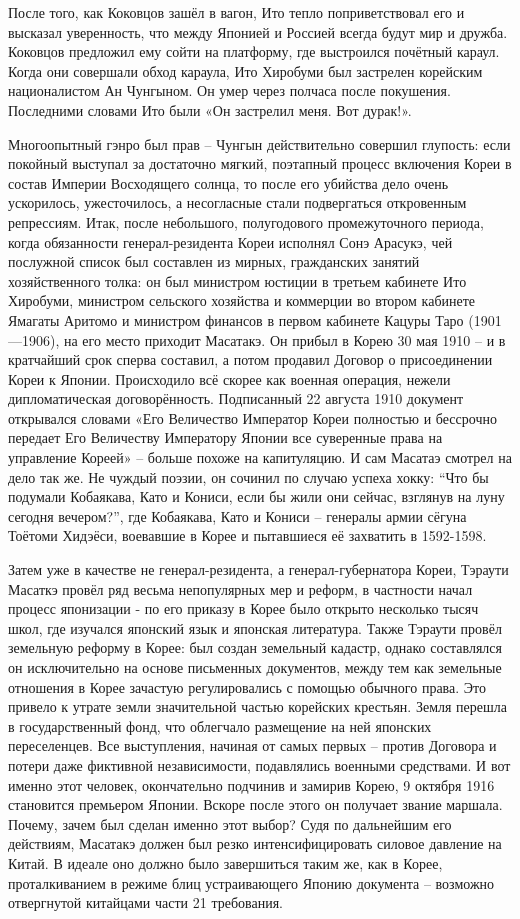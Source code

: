 После того, как Коковцов зашёл в вагон, Ито тепло поприветствовал его и высказал уверенность, что между Японией и Россией всегда будут мир и дружба. Коковцов предложил ему сойти на платформу, где выстроился почётный караул. Когда они совершали обход караула, Ито Хиробуми был застрелен корейским националистом Ан Чунгыном. Он умер через полчаса после покушения. Последними словами Ито были «Он застрелил меня. Вот дурак!».

Многоопытный гэнро был прав – Чунгын действительно совершил глупость: если покойный выступал за достаточно мягкий, поэтапный процесс включения Кореи в состав Империи Восходящего солнца, то после его убийства дело очень ускорилось, ужесточилось, а несогласные стали подвергаться откровенным репрессиям. Итак, после небольшого, полугодового промежуточного периода, когда обязанности генерал-резидента Кореи исполнял Сонэ Арасукэ, чей послужной список был составлен из мирных, гражданских занятий хозяйственного толка: он был министром юстиции в третьем кабинете Ито Хиробуми, министром сельского хозяйства и коммерции во втором кабинете Ямагаты Аритомо и министром финансов в первом кабинете Кацуры Таро (1901—1906), на его место приходит Масатакэ. Он прибыл в Корею 30 мая 1910 – и в кратчайший срок сперва составил, а потом продавил Договор о присоединении Кореи к Японии. Происходило всё скорее как военная операция, нежели дипломатическая договорённость. Подписанный 22 августа 1910 документ открывался словами «Его Величество Император Кореи полностью и бессрочно передает Его Величеству Императору Японии все суверенные права на управление Кореей» – больше похоже на капитуляцию. И сам Масатаэ смотрел на дело так же. Не чуждый поэзии, он сочинил по случаю успеха хокку: “Что бы подумали Кобаякава, Като и Кониси, если бы жили они сейчас, взглянув на луну сегодня вечером?”, где Кобаякава, Като и Кониси – генералы армии сёгуна Тоётоми Хидэёси, воевавшие в Корее и пытавшиеся её захватить в 1592-1598.

Затем уже в качестве не генерал-резидента, а генерал-губернатора Кореи, Тэраути Масаткэ провёл ряд весьма непопулярных мер и реформ, в частности начал процесс японизации - по его приказу в Корее было открыто несколько тысяч школ, где изучался японский язык и японская литература. Также Тэраути провёл земельную реформу в Корее: был создан земельный кадастр, однако составлялся он исключительно на основе письменных документов, между тем как земельные отношения в Корее зачастую регулировались с помощью обычного права. Это привело к утрате земли значительной частью корейских крестьян. Земля перешла в государственный фонд, что облегчало размещение на ней японских переселенцев. Все выступления, начиная от самых первых – против Договора и потери даже фиктивной независимости, подавлялись военными средствами. И вот именно этот человек, окончательно подчинив и замирив Корею, 9 октября 1916 становится премьером Японии. Вскоре после этого он получает звание маршала. Почему, зачем был сделан именно этот выбор? Судя по дальнейшим его действиям, Масатакэ должен был резко интенсифицировать силовое давление на Китай. В идеале оно должно было завершиться таким же, как в Корее, проталкиванием в режиме блиц устраивающего Японию документа – возможно отвергнутой китайцами части 21 требования.

